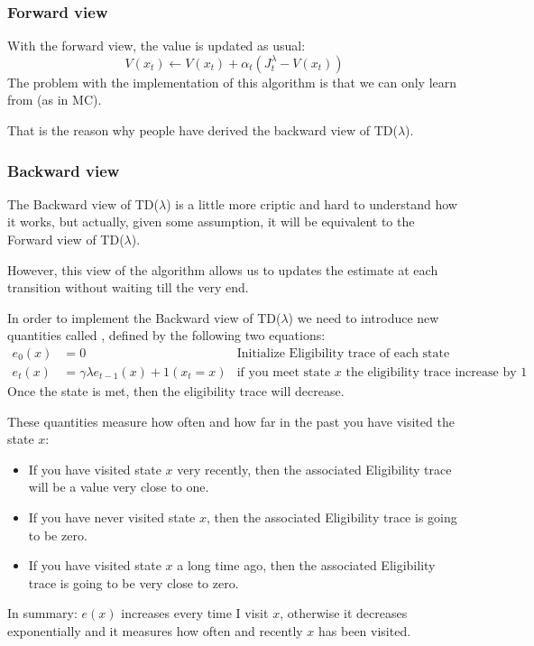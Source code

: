 \subsubsection{Forward view}
With the forward view, the value is updated as usual:
\[V(x_t)\leftarrow V(x_t) + \alpha_t (J_t^{\lambda} - V(x_t))\]
The problem with the implementation of this algorithm is that we can only learn from  (as in MC).

That is the reason why people have derived the backward view of TD($\lambda$).
 
\subsubsection{Backward view}
The Backward view of TD($\lambda$) is a little more criptic and hard to understand how it works, but actually, given some assumption, it will be equivalent to the Forward view of TD($\lambda$).

However, this view of the algorithm allows us to updates the estimate at each transition without waiting till the very end.

In order to implement the Backward view of TD($\lambda$) we need to introduce new quantities called , defined by the following two equations:
\begin{align*}
e_0(x) &= 0&\text{Initialize Eligibility trace of each state to 0}\\
e_t(x) &= \gamma\lambda e_{t-1}(x) + 1(x_t=x)&\text{if you meet state }x\text{ the eligibility trace increase by 1}
\end{align*}
Once the state is met, then the eligibility trace will decrease.

These quantities measure how often and how far in the past you have visited the state $x$:
\begin{itemize}
\item If you have visited state $x$ very recently, then the associated Eligibility trace will be a value very close to one.
\item If you have never visited state $x$, then the associated Eligibility trace is going to be zero.
\item If you have visited state $x$ a long time ago, then the associated Eligibility trace is going to be very close to zero.
\end{itemize}

In summary: $e(x)$ increases every time I visit $x$, otherwise it decreases exponentially and it measures how often and recently $x$ has been visited.

